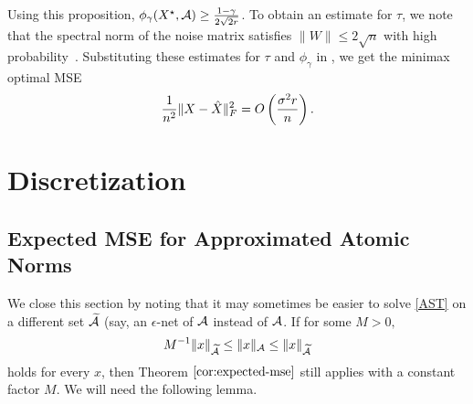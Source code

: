 Using this proposition, $\phi_\gamma(X^\star,\mathcal{A}) \geq
\frac{1-\gamma}{2\sqrt{2r}}$. To obtain an estimate for $\tau$, we note that
the spectral norm of the noise matrix satisfies $\|W\|\leq
2\sqrt{n}$ with high probability~\cite{Davidson01}. Substituting these
estimates for $\tau$ and $\phi_\gamma$ in , we get
the minimax optimal MSE
\begin{align*}
\frac{1}{n^2}\lVert X-\hat{X}\rVert_F^2 = O\left( \frac{\sigma^2 r}{n} \right).
\end{align*}

\section{Discretization}
\subsection{Expected MSE for Approximated Atomic Norms}
\label{proof:expected-mse-approx}

We close this section by noting that it may sometimes be easier to solve
\eqref{AST} on a different set $\widetilde{\mathcal{A}}$ (say, an $\epsilon$-net of
$\mathcal{A}$ instead of $\mathcal{A}$. If for some $M>0,$
\[
M^{-1}\lVert x\rVert_{\widetilde{\mathcal{A}}} \leq \lVert x\rVert_{\mathcal{A}} \leq 
\lVert x\rVert_{\widetilde{\mathcal{A}}}
\] 
holds for every $x$, then Theorem $\ref{cor:expected-mse}$ still applies with a 
constant factor $M$. We will need the following lemma.

